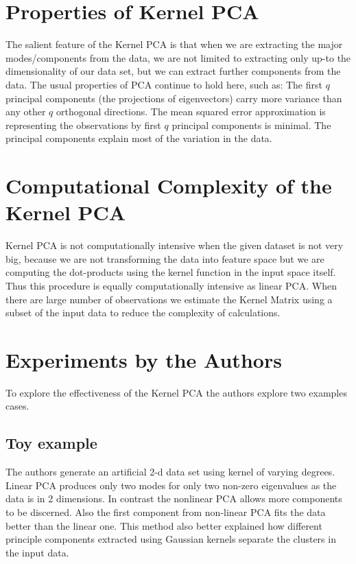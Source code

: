 \section{Properties of Kernel PCA}

The salient feature of the Kernel PCA is that when we are extracting the major modes/components from the data, we are not limited to extracting only up-to the dimensionality of our data set, but we can extract further components from the data. The usual properties of PCA continue to hold here, such as: The first $q$ principal components (the projections of eigenvectors) carry more variance than any other $q$ orthogonal directions. The mean squared error approximation is representing the observations by first $q$ principal components is minimal. The principal components explain most of the variation in the data. 

\section{Computational Complexity of the Kernel PCA}

Kernel PCA is not computationally intensive when the given dataset is not very big, because we are not transforming the data into feature space but we are computing the dot-products using the kernel function in the input space itself. Thus this procedure is equally computationally intensive as linear PCA. When there are large number of observations we estimate the Kernel Matrix using a subset of the input data to reduce the complexity of calculations. 


\section{Experiments by the Authors}
To explore the effectiveness of the Kernel PCA the authors explore two examples cases.

\subsection{Toy example}
The authors generate an artificial 2-d data set using kernel of varying degrees. Linear PCA produces only two modes for only two non-zero eigenvalues as the data is in 2 dimensions. In contrast the nonlinear PCA allows more components to be discerned. Also the first component from non-linear PCA fits the data better than the linear one. This method also better explained how different principle components extracted using Gaussian kernels separate the clusters in the input data.

